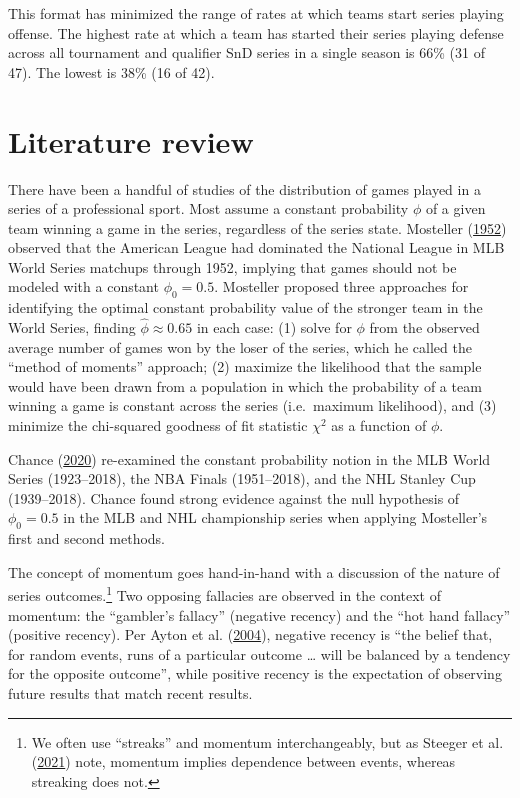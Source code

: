 \documentclass{article}
\begin{document}
This format has minimized the range of rates at which teams start series
playing offense. The highest rate at which a team has started their
series playing defense across all tournament and qualifier SnD series in
a single season is 66\% (31 of 47). The lowest is 38\% (16 of 42).

\hypertarget{literature-review}{%
\section{Literature review}\label{literature-review}}

There have been a handful of studies of the distribution of games played
in a series of a professional sport. Most assume a constant probability
\(\phi\) of a given team winning a game in the series, regardless of the
series state. Mosteller (\protect\hyperlink{ref-mosteller1952}{1952})
observed that the American League had dominated the National League in
MLB World Series matchups through 1952, implying that games should not
be modeled with a constant \(\phi_0 = 0.5\). Mosteller proposed three
approaches for identifying the optimal constant probability value of the
stronger team in the World Series, finding \(\hat{\phi} \approx 0.65\)
in each case: (1) solve for \(\phi\) from the observed average number of
games won by the loser of the series, which he called the ``method of
moments'' approach; (2) maximize the likelihood that the sample would
have been drawn from a population in which the probability of a team
winning a game is constant across the series (i.e.~maximum likelihood),
and (3) minimize the chi-squared goodness of fit statistic \(\chi^2\) as
a function of \(\phi\).

Chance (\protect\hyperlink{ref-chance2020}{2020}) re-examined the
constant probability notion in the MLB World Series (1923--2018), the
NBA Finals (1951--2018), and the NHL Stanley Cup (1939--2018). Chance
found strong evidence against the null hypothesis of \(\phi_0 = 0.5\) in
the MLB and NHL championship series when applying Mosteller's first and
second methods.

The concept of momentum goes hand-in-hand with a discussion of the
nature of series outcomes.\footnote{We often use ``streaks'' and
  momentum interchangeably, but as Steeger et al.
  (\protect\hyperlink{ref-steeger2021}{2021}) note, momentum implies
  dependence between events, whereas streaking does not.} Two opposing
fallacies are observed in the context of momentum: the ``gambler's
fallacy'' (negative recency) and the ``hot hand fallacy'' (positive
recency). Per Ayton et al. (\protect\hyperlink{ref-ayton2004}{2004}),
negative recency is ``the belief that, for random events, runs of a
particular outcome \ldots{} will be balanced by a tendency for the
opposite outcome'', while positive recency is the expectation of
observing future results that match recent results.
\end{document}
